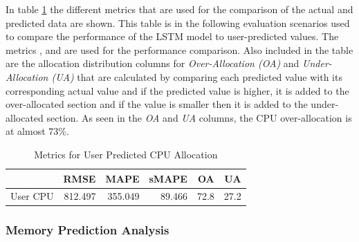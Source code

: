       In table \ref{tab:metric-cpu-user-predicted} the different metrics that are used for the comparison of the actual and predicted data are shown. 
      This table is in the following evaluation scenarios used to compare the performance of the LSTM model to user-predicted values.
      The metrics ,   and  are used for the performance comparison.
      Also included in the table are the allocation distribution columns for \emph{Over-Allocation (OA)} and \emph{Under-Allocation (UA)} that are calculated by comparing each predicted value with its corresponding actual value and if the predicted value is higher, it is added to the over-allocated section and if the value is smaller then it is added to the under-allocated section.
      As seen in the \emph{OA} and \emph{UA} columns, the CPU over-allocation is at almost $73 \%$.
      \begin{table}
        \centering
        \caption{Metrics for User Predicted CPU Allocation}
        \label{tab:metric-cpu-user-predicted}
        \begin{tabular}{|l|rrrrr|}
          \toprule
          {} &     RMSE &     MAPE &   sMAPE &    OA &    UA \\
          \midrule
          User CPU &  812.497 &  355.049 &  89.466 &  72.8 &  27.2 \\
          \bottomrule
          \end{tabular}
      \end{table}

    \subsubsection{Memory Prediction Analysis}
    \label{sec:user-defined-memory-prediction-analysis-evaluation-scenario}

